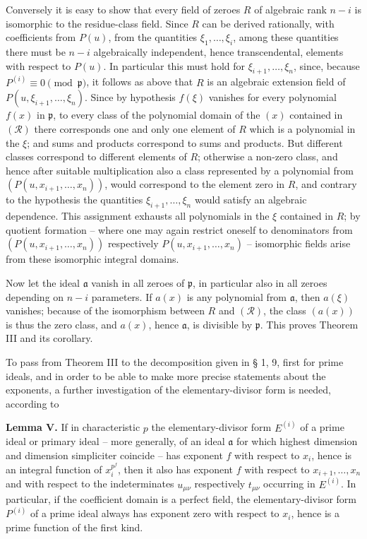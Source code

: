 \documentclass[11pt]{article}
\providecommand{\frakp}{\mathfrak p}
\providecommand{\fraka}{\mathfrak a}
\begin{document}
Conversely it is easy to show that every field of zeroes $R$ of algebraic rank $n-i$ is isomorphic to the residue-class field. Since $R$ can be derived rationally, with coefficients from $P(u)$, from the quantities $\xi_1,\ldots,\xi_i$, among these quantities there must be $n-i$ algebraically independent, hence transcendental, elements with respect to $P(u)$. In particular this must hold for $\xi_{i+1},\ldots,\xi_n$, since, because $P^{(i)}\equiv0\pmod{\frakp}$, it follows as above that $R$ is an algebraic extension field of $P(u,\xi_{i+1},\ldots,\xi_n)$. Since by hypothesis $f(\xi)$ vanishes for every polynomial $f(x)$ in $\frakp$, to every class of the polynomial domain of the $(x)$ contained in $(\mathcal R)$ there corresponds one and only one element of $R$ which is a polynomial in the $\xi$; and sums and products correspond to sums and products. But different classes correspond to different elements of $R$; otherwise a non-zero class, and hence after suitable multiplication also a class represented by a polynomial from $(P(u,x_{i+1},\ldots,x_n))$, would correspond to the element zero in $R$, and contrary to the hypothesis the quantities $\xi_{i+1},\ldots,\xi_n$ would satisfy an algebraic dependence. This assignment exhausts all polynomials in the $\xi$ contained in $R$; by quotient formation -- where one may again restrict oneself to denominators from $(P(u,x_{i+1},\ldots,x_n))$ respectively $P(u,x_{i+1},\ldots,x_n)$ -- isomorphic fields arise from these isomorphic integral domains.

Now let the ideal $\fraka$ vanish in all zeroes of $\frakp$, in particular also in all zeroes depending on $n-i$ parameters. If $a(x)$ is any polynomial from $\fraka$, then $a(\xi)$ vanishes; because of the isomorphism between $R$ and $(\mathcal R)$, the class $(a(x))$ is thus the zero class, and $a(x)$, hence $\fraka$, is divisible by $\frakp$. This proves Theorem III and its corollary.

To pass from Theorem III to the decomposition given in § 1, 9, first for prime ideals, and in order to be able to make more precise statements about the exponents, a further investigation of the elementary-divisor form is needed, according to

\textbf{Lemma V.} If in characteristic $p$ the elementary-divisor form $E^{(i)}$ of a prime ideal or primary ideal -- more generally, of an ideal $\fraka$ for which highest dimension and dimension simpliciter coincide -- has exponent $f$ with respect to $x_i$, hence is an integral function of $x_i^{p^f}$, then it also has exponent $f$ with respect to $x_{i+1},\ldots,x_n$ and with respect to the indeterminates $u_{\mu\nu}$ respectively $t_{\mu\nu}$ occurring in $E^{(i)}$. In particular, if the coefficient domain is a perfect field, the elementary-divisor form $P^{(i)}$ of a prime ideal always has exponent zero with respect to $x_i$, hence is a prime function of the first kind.
\end{document}
